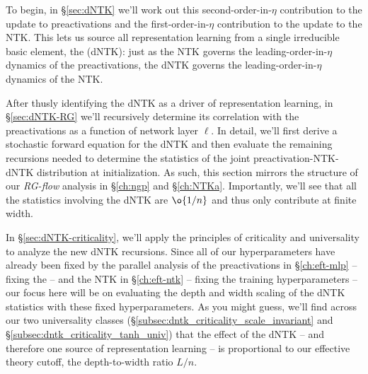 To begin, in  \S\ref{sec:dNTK} we'll work out this second-order-in-$\eta$ contribution to the update to preactivations and the first-order-in-$\eta$ contribution to the update to the NTK.
This lets us source all representation learning from a single irreducible basic element, 
the  (dNTK): just as the NTK governs the leading-order-in-$\eta$ dynamics of the preactivations, the dNTK governs the leading-order-in-$\eta$ dynamics of the NTK. %




After thusly identifying the dNTK as a driver of representation learning, in \S\ref{sec:dNTK-RG} we'll recursively determine its correlation with the preactivations as a function of network layer $\ell$. In detail, we'll first derive a stochastic forward equation for the dNTK and then evaluate the remaining recursions needed to determine the statistics of the joint preactivation-NTK-dNTK distribution at initialization. As such, this section mirrors the structure of our  \emph{RG-flow} analysis in \S\ref{ch:ngp} and \S\ref{ch:NTKa}.
 Importantly, we'll see that all the statistics involving the dNTK are $\o{1/n}$ and thus only contribute  at finite width.

In \S\ref{sec:dNTK-criticality}, we'll apply the principles of criticality and universality to analyze the new dNTK recursions.
Since all of our hyperparameters have already been fixed by the parallel analysis of the preactivations in \S\ref{ch:eft-mlp} -- fixing the  --  and the NTK in \S\ref{ch:eft-ntk} -- fixing the training hyperparameters -- our focus here will be on evaluating the depth and width scaling of the dNTK statistics with these fixed hyperparameters. As you might guess, we'll find across our two universality classes (\S\ref{subsec:dntk_criticality_scale_invariant} and \S\ref{subsec:dntk_criticality_tanh_univ}) that the effect of the dNTK -- and therefore one source of representation learning -- is proportional to our effective theory cutoff, the depth-to-width ratio $L/n$.




